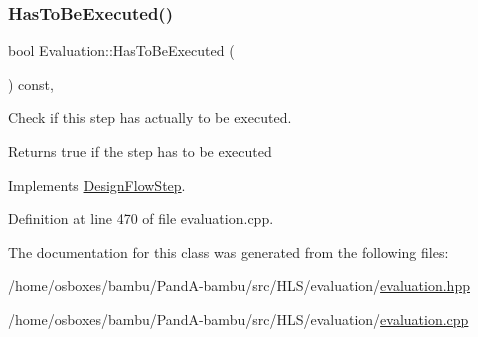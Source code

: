 \subsubsection{\texorpdfstring{Has\+To\+Be\+Executed()}{HasToBeExecuted()}}
{\footnotesize\ttfamily bool Evaluation\+::\+Has\+To\+Be\+Executed (\begin{DoxyParamCaption}{ }\end{DoxyParamCaption}) const\hspace{0.3cm}{\ttfamily [override]}, {\ttfamily [virtual]}}



Check if this step has actually to be executed. 

\begin{DoxyReturn}{Returns}
true if the step has to be executed 
\end{DoxyReturn}


Implements \hyperlink{classDesignFlowStep_a1783abe0c1d162a52da1e413d5d1ef05}{Design\+Flow\+Step}.



Definition at line 470 of file evaluation.\+cpp.



The documentation for this class was generated from the following files\+:\begin{DoxyCompactItemize}
\item 
/home/osboxes/bambu/\+Pand\+A-\/bambu/src/\+H\+L\+S/evaluation/\hyperlink{evaluation_8hpp}{evaluation.\+hpp}\item 
/home/osboxes/bambu/\+Pand\+A-\/bambu/src/\+H\+L\+S/evaluation/\hyperlink{evaluation_8cpp}{evaluation.\+cpp}\end{DoxyCompactItemize}
